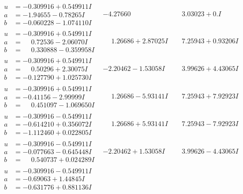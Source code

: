 \documentclass[1p]{elsarticle_modified}
\theoremstyle{definition}
\begin{document}
$$\begin{array}{c|c|c}
\begin{aligned}
u &= -0.309916 + 0.549911 I \\
a &= -1.94655 - 0.78265 I \\
b &= -0.060228 - 1.074110 I\end{aligned}
 & -4.27660\phantom{ +0.000000I} & \phantom{-}3.03023 + 0. I\phantom{ +0.000000I} \\ \hline\begin{aligned}
u &= -0.309916 + 0.549911 I \\
a &= \phantom{-}0.72536 - 2.06070 I \\
b &= \phantom{-}0.330888 - 0.359958 I\end{aligned}
 & \phantom{-}1.26686 + 2.87025 I & \phantom{-}7.25943 + 0.93206 I \\ \hline\begin{aligned}
u &= -0.309916 + 0.549911 I \\
a &= \phantom{-}0.50296 + 2.30075 I \\
b &= -0.127790 + 1.025730 I\end{aligned}
 & -2.20462 - 1.53058 I & \phantom{-}3.99626 + 4.43065 I \\ \hline\begin{aligned}
u &= -0.309916 + 0.549911 I \\
a &= -0.41156 - 2.99999 I \\
b &= \phantom{-}0.451097 - 1.069650 I\end{aligned}
 & \phantom{-}1.26686 - 5.93141 I & \phantom{-}7.25943 + 7.92923 I \\ \hline\begin{aligned}
u &= -0.309916 - 0.549911 I \\
a &= -0.614210 + 0.356072 I \\
b &= -1.112460 + 0.022805 I\end{aligned}
 & \phantom{-}1.26686 + 5.93141 I & \phantom{-}7.25943 - 7.92923 I \\ \hline\begin{aligned}
u &= -0.309916 - 0.549911 I \\
a &= -0.077663 - 0.645448 I \\
b &= \phantom{-}0.540737 + 0.024289 I\end{aligned}
 & -2.20462 + 1.53058 I & \phantom{-}3.99626 - 4.43065 I \\ \hline\begin{aligned}
u &= -0.309916 - 0.549911 I \\
a &= -0.69063 + 1.44845 I \\
b &= -0.631776 + 0.881136 I\end{aligned}

\end{array}$$
\end{document}
